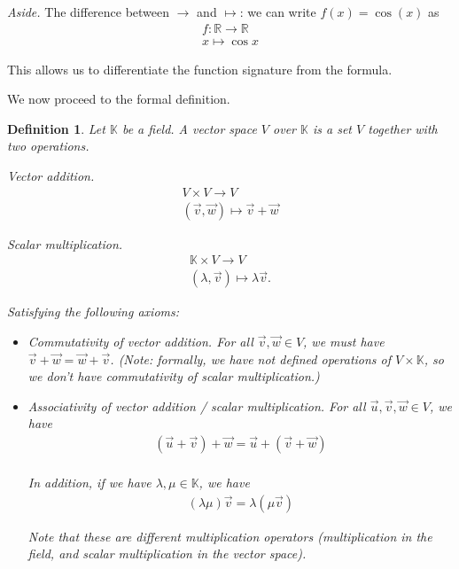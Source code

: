 \documentclass[12pt]{article}
\newtheorem*{definition}{Definition}
\newcommand{\RR}{\mathbb{R}}
\def\KK{\mathbb{K}}
\def\lb{\lambda}
\begin{document}
  {\it Aside.} The difference between $\to$ and $\mapsto$: we can write $f(x) = \cos(x)$ as
\begin{align*}
  f: \RR \to \RR \\
  x \mapsto \cos x
\end{align*}

This allows us to differentiate the function signature from the formula.

We now proceed to the formal definition. \\

\begin{definition}
  Let $\KK$ be a field.  A vector space $V$ over $\KK$ is a set $V$ together with two operations.

  {\it Vector addition.}
  \begin{align*}
    V \times V \to V \\
    (\vec{v}, \vec{w}) \mapsto \vec{v} + \vec{w}
  \end{align*}

  {\it Scalar multiplication.}
  \begin{align*}
    \mathbb{K} \times V \to V \\
    (\lambda, \vec{v}) \mapsto \lambda \vec{v}.
  \end{align*}

  Satisfying the following axioms:

  \begin{itemize}
    \item Commutativity of vector addition.  For all $\vec{v}, \vec{w} \in V$, we must have $\vec{v} + \vec{w} = \vec{w} + \vec{v}$.  (Note: formally, we have not defined operations of $V \times \KK$, so we don't have commutativity of scalar multiplication.)

    \item Associativity of vector addition / scalar multiplication.  For all $\vec{u}, \vec{v}, \vec{w} \in V$, we have
      \begin{align*}
      (\vec{u} + \vec{v}) + \vec{w} = \vec{u} + (\vec{v}  + \vec{w}) \\
      \end{align*}

      In addition, if we have $\lambda, \mu \in \KK$, we have
      \begin{align*}
        (\lambda \mu) \vec{v} = \lb (\mu \vec{v})
      \end{align*}

      Note that these are different multiplication operators (multiplication in the field, and scalar multiplication in the vector space).
    

\end{itemize}
\end{definition}
\end{document}

